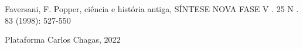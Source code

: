 \documentclass[
12pt,		%
openright,	%
twoside,  %
a4paper,			%
chapter=TITLE,		%
english,			%
french,				%
spanish,			%
brazil				%
]{USPSC-classe/USPSC}
\begin{document}
\begin{flushleft}
\begin{flushleft}
\begin{flushleft}
\begin{flushleft}
\begin{flushleft}
\begin{flushleft}
\begin{flushleft}
\begin{flushleft}
\begin{flushleft}
[FAVERSANI, 1998] Faversani, F. Popper, ci\^encia e hist\'oria antiga, S\'INTESE NOVA FASE V . 25 N . 83 (1998): 527-550
\end{flushleft}


\end{flushleft}


\end{flushleft}


\end{flushleft}


\end{flushleft}


\end{flushleft}


\end{flushleft}


\end{flushleft}


\end{flushleft}


\begin{flushleft}
\begin{flushleft}
\begin{flushleft}
\begin{flushleft}
\begin{flushleft}
\begin{flushleft}
\begin{flushleft}
\begin{flushleft}
\begin{flushleft}
[CHAGAS, 2022] Plataforma Carlos Chagas, 2022
\end{flushleft}


\end{flushleft}


\end{flushleft}


\end{flushleft}


\end{flushleft}


\end{flushleft}


\end{flushleft}


\end{flushleft}


\end{flushleft}
\end{document}
